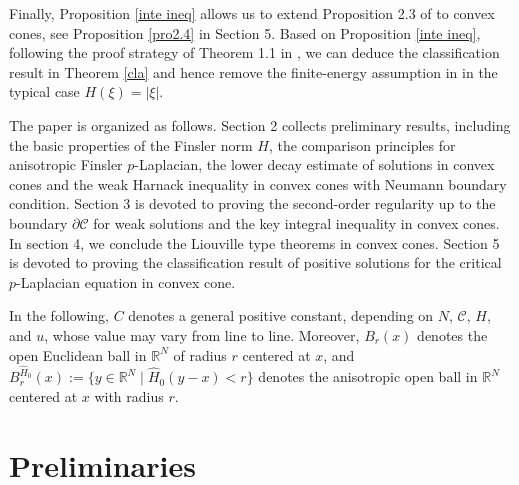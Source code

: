 \documentclass[12pt]{amsart}
\newtheorem{lem}[thm]{Lemma}
\theoremstyle{definition}
\theoremstyle{remark}
\theoremstyle{conclusion}
\theoremstyle{conjecture}
\numberwithin{equation}{section}
\begin{document}
\smallskip

Finally, Proposition \ref{inte ineq} allows us to extend Proposition 2.3 of \cite{Ou} to convex cones, see Proposition \ref{pro2.4} in Section 5. Based on Proposition \ref{inte ineq}, following the proof strategy of Theorem 1.1 in \cite{Ou}, we can deduce the classification result in Theorem \ref{cla} and hence remove the finite-energy assumption in \cite{CFR} in the typical case $H(\xi)=|\xi|$.

\medskip

The paper is organized as follows. Section 2 collects preliminary results, including the basic properties of the Finsler norm $H$, the comparison principles for anisotropic Finsler $p$-Laplacian, the lower decay estimate of solutions in convex cones and the weak Harnack inequality in convex cones with Neumann boundary condition.
Section 3 is devoted to proving the second-order regularity up to the boundary $\partial{\mathcal{C}}$ for weak solutions and the key integral inequality in convex cones. In section 4, we conclude the Liouville type theorems in convex cones. Section 5 is devoted to proving the classification result of positive solutions for the critical $p$-Laplacian equation in convex cone.

\medskip

In the following, $C$ denotes a general positive constant, depending on $N$, $\mathcal{C}$, $H$, and $u$, whose value may vary from line to line. Moreover, $B_r(x)$ denotes the open Euclidean ball in $\mathbb{R}^N$ of radius $r$ centered at $x$, and $B_r^{\widehat{H}_0}(x):=\{y\in\mathbb{R}^N\mid \widehat{H}_0(y-x)<r\}$ denotes the anisotropic open ball in $\mathbb{R}^N$ centered at $x$ with radius $r$.

\section{Preliminaries}

\end{document}

